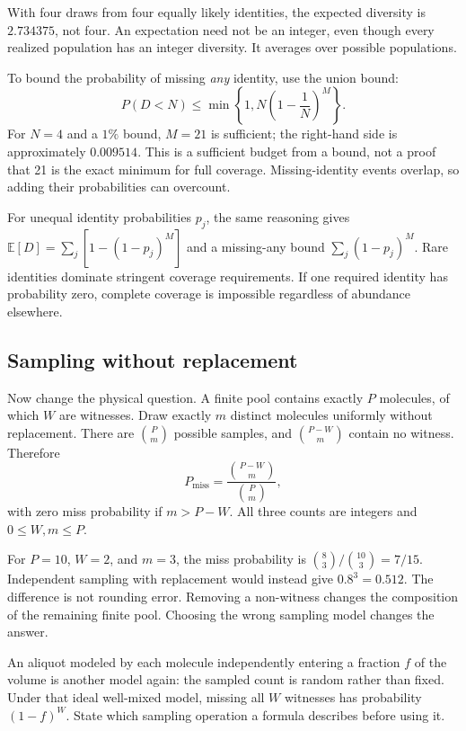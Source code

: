 With four draws from four equally likely identities, the expected diversity is $2.734375$, not four. An expectation need not be an integer, even though every realized population has an integer diversity. It averages over possible populations.

To bound the probability of missing \emph{any} identity, use the union bound:
\begin{equation}
P(D<N)\leq \min\!\left\{1,N\left(1-\frac1N\right)^M\right\}.
\label{eq:union}
\end{equation}
For $N=4$ and a $1\%$ bound, $M=21$ is sufficient; the right-hand side is approximately $0.009514$. This is a sufficient budget from a bound, not a proof that 21 is the exact minimum for full coverage. Missing-identity events overlap, so adding their probabilities can overcount.

For unequal identity probabilities $p_j$, the same reasoning gives $\mathbb E[D]=\sum_j[1-(1-p_j)^M]$ and a missing-any bound $\sum_j(1-p_j)^M$. Rare identities dominate stringent coverage requirements. If one required identity has probability zero, complete coverage is impossible regardless of abundance elsewhere.

\subsection{Sampling without replacement}

Now change the physical question. A finite pool contains exactly $P$ molecules, of which $W$ are witnesses. Draw exactly $m$ distinct molecules uniformly without replacement. There are $\binom{P}{m}$ possible samples, and $\binom{P-W}{m}$ contain no witness. Therefore
\begin{equation}
P_{\mathrm{miss}}=\frac{\binom{P-W}{m}}{\binom{P}{m}}, \label{eq:finite}
\end{equation}
with zero miss probability if $m>P-W$. All three counts are integers and $0\leq W,m\leq P$.

For $P=10$, $W=2$, and $m=3$, the miss probability is $\binom83/\binom{10}3=7/15$. Independent sampling with replacement would instead give $0.8^3=0.512$. The difference is not rounding error. Removing a non-witness changes the composition of the remaining finite pool. Choosing the wrong sampling model changes the answer.

An aliquot modeled by each molecule independently entering a fraction $f$ of the volume is another model again: the sampled count is random rather than fixed. Under that ideal well-mixed model, missing all $W$ witnesses has probability $(1-f)^W$. State which sampling operation a formula describes before using it.

